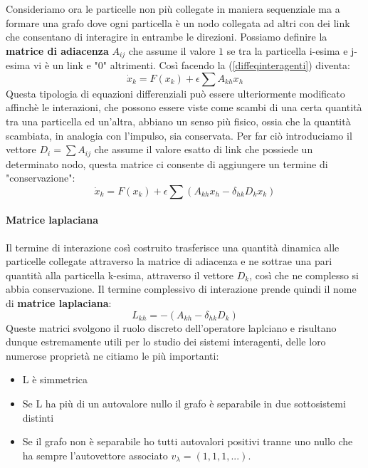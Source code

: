 Consideriamo ora le particelle non più collegate in maniera sequenziale ma a formare una grafo dove ogni particella è un nodo collegata ad altri con dei link che consentano di interagire in entrambe le direzioni. Possiamo definire la \textbf{matrice di adiacenza} $A_{ij}$ che assume il valore $1$ se tra la particella i-esima e j-esima vi è un link e "0" altrimenti. Così facendo la (\ref{diffeqinteragenti})
diventa:
\begin{equation}
		\dot{x}_k=F(x_k)+\epsilon \sum A_{kh} x_h
\end{equation}
Questa tipologia di equazioni differenziali può essere ulteriormente modificato affinchè le interazioni, che possono essere viste come scambi di una certa quantità tra una particella ed un'altra, abbiano un senso più fisico, ossia che la quantità scambiata, in analogia con l'impulso, sia conservata. Per far ciò introduciamo il vettore $D_i=\sum A_{ij}$ che assume il valore esatto di link che possiede un determinato nodo, questa matrice ci consente di aggiungere un termine di "conservazione":
\begin{equation}
	\dot{x}_k=F(x_k)+\epsilon \sum( A_{kh} x_h-\delta_{hk}D_kx_k)
\end{equation}
\paragraph{Matrice laplaciana}
Il termine di interazione così costruito trasferisce una quantità dinamica alle particelle collegate attraverso la matrice di adiacenza e ne sottrae una pari quantità alla particella k-esima, attraverso il vettore $D_k$, così che ne complesso si abbia conservazione. Il termine complessivo di interazione prende quindi il nome di \textbf{matrice laplaciana}:
\begin{equation}
	L_{kh}=-( A_{kh}-\delta_{hk}D_k)
\end{equation}
Queste matrici svolgono il ruolo discreto dell'operatore laplciano e risultano dunque estremamente utili per lo studio dei sistemi interagenti, delle loro numerose proprietà ne citiamo le più importanti:
\begin{itemize}
	\item L è simmetrica
	\item Se L ha più di un autovalore nullo il grafo è separabile in due sottosistemi distinti
	\item Se il grafo non è separabile ho tutti autovalori positivi tranne uno nullo che ha sempre l'autovettore associato $v_\lambda=(1,1,1,...)$.
\end{itemize}
